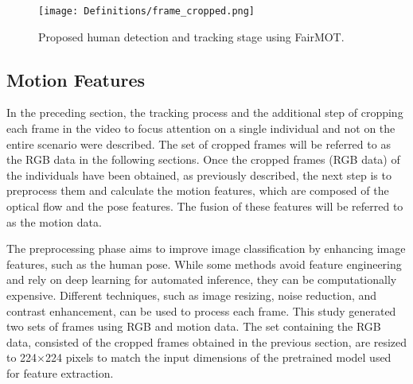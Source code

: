 \documentclass[mathematics,article,submit,pdftex,moreauthors]{Definitions/mdpi}
\begin{document}



\begin{figure}[!ht]
     \centering
     \texttt{[image: Definitions/frame\_cropped.png]}
     \caption{Proposed human detection and tracking stage using FairMOT. \label{fig:human_detection_cropped}}     
\end{figure}

\subsection{Motion Features}
\label{sec:motion_features}
In the preceding section, the tracking process and the additional step of cropping each frame in the video to focus attention on a single individual and not on the entire scenario were described. The set of cropped frames will be referred to as the RGB data in the following sections. Once the cropped frames (RGB data) of the individuals have been obtained, as previously described, the next step is to preprocess them and calculate the motion features, which are composed of the optical flow and the pose features. The fusion of these features will be referred to as the motion data. 

The preprocessing phase aims to improve image classification by enhancing image features, such as the human pose. While some methods avoid feature engineering and rely on deep learning for automated inference, they can be computationally expensive. Different techniques, such as image resizing, noise reduction, and contrast enhancement, can be used to process each frame. This study generated two sets of frames using RGB and motion data. The set containing the RGB data, consisted of the cropped frames obtained in the previous section, are resized to 224$\times$224 pixels to match the input dimensions of the pretrained model used for feature extraction.
\end{document}
